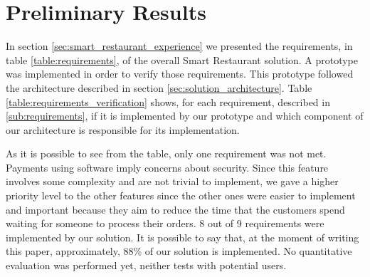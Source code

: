 
\section{Preliminary Results}
\label{sec:preliminary_results}
In section \ref{sec:smart_restaurant_experience} we presented the
requirements, in table \ref{table:requirements}, of the overall
Smart Restaurant solution.
A prototype was implemented in order to verify those requirements.
This prototype followed the architecture described in section
\ref{sec:solution_architecture}.
Table \ref{table:requirements_verification} shows, for each requirement,
described in \ref{sub:requirements}, if it is implemented by our prototype
and which component of our architecture is responsible for its implementation.



As it is possible to see from the table, only one requirement was not met.
Payments using software imply concerns about security. Since this feature
involves some complexity and are not trivial to implement, we gave
a higher priority level to the other features since the other ones were
easier to implement and important because they aim to reduce the time
that the customers spend waiting for someone to process their orders.
8 out of 9 requirements were implemented by our solution. It is possible to say
that, at the moment of writing this paper, approximately, 88\% of our solution
is implemented.
No quantitative evaluation was performed yet, neither tests with
potential users.
